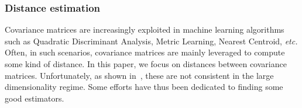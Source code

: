 \documentclass{article}
\theoremstyle{plain}
\theoremstyle{definition}
\theoremstyle{remark}
\begin{document}

\subsubsection{Distance estimation}
\label{sec:preliminaries:RMT_dist}
Covariance matrices are increasingly exploited in machine learning algorithms such as Quadratic Discriminant Analysis, Metric Learning, Nearest Centroid, \emph{etc.}
Often, in such scenarios, covariance matrices are mainly leveraged to compute some kind of distance.
In this paper, we focus on distances between covariance matrices.
Unfortunately, as shown in~\cite{couillet2019random}, these are not consistent in the large dimensionality regime.
Some efforts have thus been dedicated to finding some good estimators.
\end{document}
